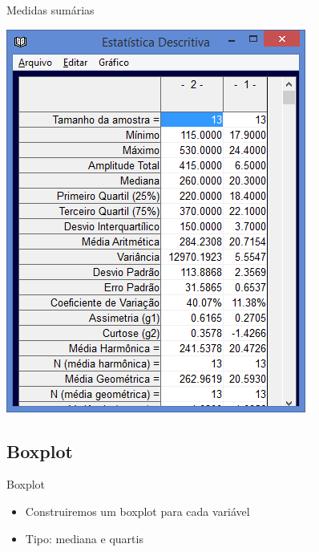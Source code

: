 \documentclass{beamer}
\begin{document}
\begin{frame}{Medidas sumárias}
  \begin{center}
    \includegraphics[height=0.9\textheight]{descritiva}
  \end{center}
\end{frame}

\subsection{Boxplot}

\begin{frame}{Boxplot}
  \begin{itemize}
  \item Construiremos um boxplot para cada variável
  \item Tipo: mediana e quartis
  \end{itemize}
\end{frame}
\end{document}
